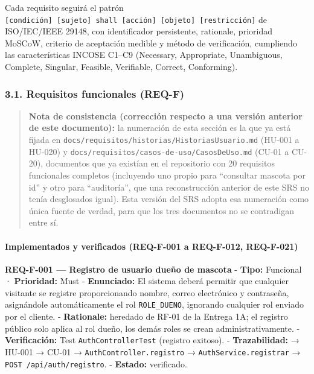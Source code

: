 \documentclass[
]{article}
\begin{document}
Cada requisito seguirá el patrón
\texttt{{[}condición{]}\ {[}sujeto{]}\ shall\ {[}acción{]}\ {[}objeto{]}\ {[}restricción{]}}
de ISO/IEC/IEEE 29148, con identificador persistente, rationale,
prioridad MoSCoW, criterio de aceptación medible y método de
verificación, cumpliendo las características INCOSE C1--C9 (Necessary,
Appropriate, Unambiguous, Complete, Singular, Feasible, Verifiable,
Correct, Conforming).

\hypertarget{requisitos-funcionales-req-f}{%
\subsubsection{3.1. Requisitos funcionales
(REQ-F)}\label{requisitos-funcionales-req-f}}

\begin{quote}
\textbf{Nota de consistencia (corrección respecto a una versión anterior
de este documento):} la numeración de esta sección es la que ya está
fijada en \texttt{docs/requisitos/historias/HistoriasUsuario.md} (HU-001
a HU-020) y \texttt{docs/requisitos/casos-de-uso/CasosDeUso.md} (CU-01 a
CU-20), documentos que ya existían en el repositorio con 20 requisitos
funcionales completos (incluyendo uno propio para ``consultar mascota
por id'' y otro para ``auditoría'', que una reconstrucción anterior de
este SRS no tenía desglosados igual). Esta versión del SRS adopta esa
numeración como única fuente de verdad, para que los tres documentos no
se contradigan entre sí.
\end{quote}

\hypertarget{implementados-y-verificados-req-f-001-a-req-f-012-req-f-021}{%
\paragraph{Implementados y verificados (REQ-F-001 a REQ-F-012,
REQ-F-021)}\label{implementados-y-verificados-req-f-001-a-req-f-012-req-f-021}}

\textbf{REQ-F-001 --- Registro de usuario dueño de mascota} -
\textbf{Tipo:} Funcional · \textbf{Prioridad:} Must -
\textbf{Enunciado:} El sistema deberá permitir que cualquier visitante
se registre proporcionando nombre, correo electrónico y contraseña,
asignándole automáticamente el rol \texttt{ROLE\_DUENO}, ignorando
cualquier rol enviado por el cliente. - \textbf{Rationale:} heredado de
RF-01 de la Entrega 1A; el registro público solo aplica al rol dueño,
los demás roles se crean administrativamente. - \textbf{Verificación:}
Test \texttt{AuthControllerTest} (registro exitoso). -
\textbf{Trazabilidad:} → HU-001 → CU-01 →
\texttt{AuthController.registro} → \texttt{AuthService.registrar} →
\texttt{POST\ /api/auth/registro}. - \textbf{Estado:} verificado.
\end{document}
